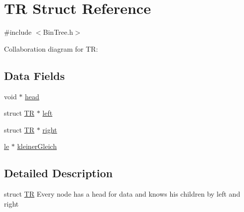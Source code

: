 \hypertarget{structTR}{\section{T\-R Struct Reference}
\label{structTR}
}


{\ttfamily \#include $<$Bin\-Tree.\-h$>$}



Collaboration diagram for T\-R\-:
\subsection*{Data Fields}
\begin{DoxyCompactItemize}
\item 
void $\ast$ \hyperlink{structTR_a4a6e0ce8984eafdf3f9a0f2dc37188ea}{head}
\item 
struct \hyperlink{structTR}{T\-R} $\ast$ \hyperlink{structTR_a2a6824313e4bd8f243ea5c989d245c6a}{left}
\item 
struct \hyperlink{structTR}{T\-R} $\ast$ \hyperlink{structTR_a66e2c91878541eef40a1ffde509a4d5e}{right}
\item 
\hyperlink{BinTree_8h_ae89f9f095232167d2e3cc1a0a3e8cf1c}{le} $\ast$ \hyperlink{structTR_acc3b4851c26d2ad30a2226cc16ff54c4}{kleiner\-Gleich}
\end{DoxyCompactItemize}


\subsection{Detailed Description}
struct \hyperlink{structTR}{T\-R} Every node has a head for data and knows his children by left and right 

